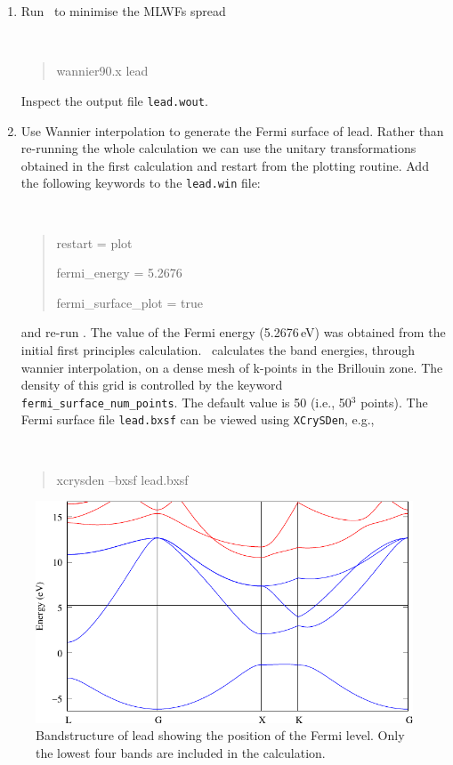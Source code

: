 \documentclass[a4paper,11pt,twoside]{article}
\begin{document}
\begin{enumerate}
\item Run \wannier\ to minimise the MLWFs spread
{\tt
\begin{quote}
wannier90.x lead
\end{quote} }
Inspect the output file {\tt lead.wout}.
\item Use Wannier interpolation to generate the Fermi surface of
  lead. Rather than re-running the whole calculation we can use the
  unitary transformations obtained in the first calculation and
  restart from the plotting routine. Add the following keywords to the
  {\tt lead.win} file: {\tt
\begin{quote}
restart = plot

fermi\_energy = 5.2676

fermi\_surface\_plot = true
\end{quote} } and re-run \wannier. The value of the Fermi energy
(5.2676\,eV) was obtained from the initial first principles
calculation. \wannier\ calculates the band energies, through wannier
interpolation, on a dense mesh of k-points in the Brillouin zone. The
density of this grid is controlled by the keyword {\tt
  fermi\_surface\_num\_points}. The default value is 50 (i.e., 50$^3$
points).  The Fermi surface file {\tt lead.bxsf} can be viewed using
{\tt XCrySDen}, e.g., 
%
{\tt
\begin{quote}
xcrysden --bxsf lead.bxsf
\end{quote} }
\end{enumerate}

\begin{figure}[h]
\begin{center}
\includegraphics{lead}
\caption{Bandstructure of lead showing the position of the Fermi
  level. Only the lowest four bands are included in the calculation.} 
\label{fig:pb-bnd}
\end{center}
\end{figure}
\end{document}
